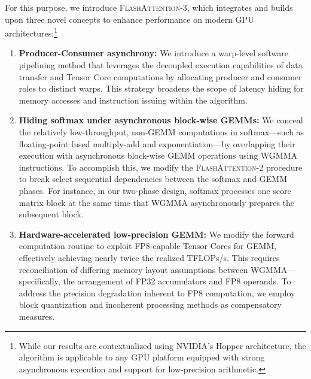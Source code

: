 For this purpose, we introduce \textsc{FlashAttention-3}, which integrates and builds upon three novel concepts to enhance performance on modern GPU architectures:\footnote{While our results are contextualized using NVIDIA's Hopper architecture, the algorithm is applicable to any GPU platform equipped with strong asynchronous execution and support for low-precision arithmetic.}

\begin{enumerate}

\item \textbf{Producer-Consumer asynchrony:} We introduce a warp-level software pipelining method that leverages the decoupled execution capabilities of data transfer and Tensor Core computations by allocating producer and consumer roles to distinct warps. This strategy broadens the scope of latency hiding for memory accesses and instruction issuing within the algorithm.
\item \textbf{Hiding softmax under asynchronous block-wise GEMMs:} We conceal the relatively low-throughput, non-GEMM computations in softmax—such as floating-point fused multiply-add and exponentiation—by overlapping their execution with asynchronous block-wise GEMM operations using WGMMA instructions. To accomplish this, we modify the \textsc{FlashAttention-2} procedure to break select sequential dependencies between the softmax and GEMM phases. For instance, in our two-phase design, softmax processes one score matrix block at the same time that WGMMA asynchronously prepares the subsequent block.
\item \textbf{Hardware-accelerated low-precision GEMM:} We modify the forward computation routine to exploit FP8-capable Tensor Cores for GEMM, effectively achieving nearly twice the realized TFLOPs/s. This requires reconciliation of differing memory layout assumptions between WGMMA—specifically, the arrangement of FP32 accumulators and FP8 operands. To address the precision degradation inherent to FP8 computation, we employ block quantization and incoherent processing methods as compensatory measures.
\end{enumerate}

